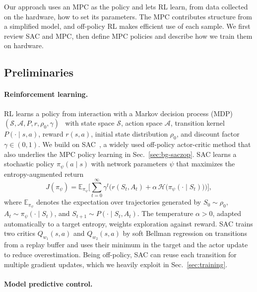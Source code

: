 \documentclass{l4dc2027}
\let\cite\citep
\begin{document}
Our approach uses an \ac{MPC} as the policy and lets \ac{RL} learn, from
data collected on the hardware, how to set its parameters. The \ac{MPC}
contributes structure from a simplified model, and off-policy \ac{RL} makes
efficient use of each sample. We first review \ac{SAC} and \ac{MPC}, then
define \ac{MPC} policies and describe how we train them on hardware.

\subsection{Preliminaries}
\label{sec:background}

\paragraph{Reinforcement learning.}
\label{sec:bg-rl}

\ac{RL} learns a policy from interaction with a Markov decision process (MDP)
$(\mathcal{S},\mathcal{A},P,r,\rho_0,\gamma)$~\cite{sutton2018rl} with state
space $\mathcal{S}$, action space $\mathcal{A}$, transition kernel
$P(\cdot\mid s,a)$, reward $r(s,a)$, initial state distribution $\rho_0$, and
discount factor $\gamma\in(0,1)$. We build on
\ac{SAC}~\cite{haarnoja2019sacapps}, a widely used off-policy actor-critic
method that also underlies the \ac{MPC} policy learning in
Sec.~\ref{sec:bg-saczop}. \ac{SAC} learns a stochastic policy
$\pi_\psi(a\mid s)$ with network parameters $\psi$ that maximizes the
entropy-augmented return
\begin{equation}
  J(\pi_\psi) = \mathbb{E}_{\pi_\psi}\Big[\sum_{t=0}^{\infty}\gamma^t
  \big(r(S_t,A_t) + \alpha\,\mathcal{H}\big(\pi_\psi(\cdot\mid S_t)\big)\big)\Big],
  \label{eq:maxent}
\end{equation}
where $\mathbb{E}_{\pi_\psi}$ denotes the expectation over trajectories
generated by $S_0\sim\rho_0$, $A_t\sim\pi_\psi(\cdot\mid S_t)$, and
$S_{t+1}\sim P(\cdot\mid S_t,A_t)$. The temperature $\alpha>0$, adapted
automatically to a target entropy, weights exploration against reward. \ac{SAC} trains two critics $Q_{w_1}(s,a)$
and $Q_{w_2}(s,a)$ by soft Bellman regression on transitions from a replay
buffer and uses their minimum in the target and the actor update to reduce
overestimation. Being off-policy, \ac{SAC} can reuse each
transition for multiple gradient updates, which we heavily exploit in
Sec.~\ref{sec:training}.

\paragraph{Model predictive control.}
\label{sec:bg-mpc}
\end{document}
